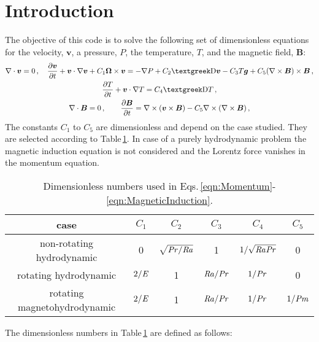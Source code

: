 \section{Introduction\label{sec:Introduction}}
The objective of this code is to solve the following set of dimensionless equations for the velocity, $\bm{v}$, a pressure, $P$, the temperature, $T$, and the magnetic field, $\bm{B}$:
\begin{gather}
	\nabla\cdot\bm{v}=0\,,\quad
	\pd{\bm{v}}{t}+\bm{v}\cdot\nabla\bm{v}+C_1\bm{\Omega}\times\bm{v}=-\nabla P+C_2\laplace\bm{v}-C_3T\bm{g}+C_5(\nabla\times\bm{B})\times\bm{B}\,,\label{eqn:Momentum}\\
	\pd{T}{t}+\bm{v}\cdot\nabla T=C_4\laplace T\,,\label{eqn:Energy}\\
	\nabla\cdot\bm{B}=0\,,\qquad
	\pd{\bm{B}}{t}=\nabla\times(\bm{v}\times\bm{B})-C_5\nabla\times(\nabla\times\bm{B})\,,\label{eqn:MagneticInduction}
\end{gather}
The constants $C_1$ to $C_5$ are dimensionless and depend on the case studied. They are selected according to Table\,\ref{tbl:Dimensionless}. In case of a purely hydrodynamic problem the magnetic induction equation is not considered and the Lorentz force vanishes in the momentum equation.
\begin{table}[!htb]
	\centering
	\caption{Dimensionless numbers used in Eqs.\,\eqref{eqn:Momentum}-\eqref{eqn:MagneticInduction}.\label{tbl:Dimensionless}}
	\begin{tabular}{cccccc}
		\toprule
		case & $C_1$ & $C_2$ & $C_3$ & $C_4$ & $C_5$ \\\midrule
		non-rotating hydrodynamic & 0 & $\sqrt{\mathit{Pr}/\mathit{Ra}}$ & 1 & $1/\sqrt{\mathit{Ra}\mathit{Pr}}$ & 0\\
		rotating hydrodynamic & $2/\mathit{E}$ & 1 & $\mathit{Ra}/\mathit{Pr}$ & $1/\mathit{Pr}$ & 0\\
		rotating magnetohydrodynamic & $2/\mathit{E}$ & 1 & $\mathit{Ra}/\mathit{Pr}$ & $1/\mathit{Pr}$ & $1/\mathit{Pm}$\\
		\bottomrule
	\end{tabular}
\end{table}
The dimensionless numbers in Table\,\ref{tbl:Dimensionless} are defined as follows:
